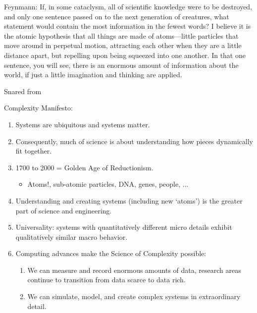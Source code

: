 \begin{frame}
  \small

  \begin{block}{Feynmann:}
    If, in some cataclysm, all of scientific knowledge were to be
    destroyed, and only one sentence passed on to the next generation of
    creatures, what statement would contain the most information in the
    fewest words? I believe it is the atomic hypothesis that all things
    are made of atoms---little particles that move around in perpetual
    motion, attracting each other when they are a little distance apart,
    but repelling upon being squeezed into one another. In that one
    sentence, you will see, there is an enormous amount of information
    about the world, if just a little imagination and thinking are
    applied.
  \end{block}

  \tiny
  Snared from 

\end{frame}


\begin{frame}
  \small

  \begin{block}{Complexity Manifesto:}
    \begin{enumerate}
    \item<+->
      Systems are ubiquitous and systems matter.
    \item<+->
      Consequently, much of science is about understanding
      how pieces dynamically fit together.
    \item<+->
      1700 to 2000 = Golden Age of Reductionism.
      \begin{itemize}
      \item 
        Atoms!, sub-atomic particles, DNA, genes, people, ...
      \end{itemize}
    \item<+->
      Understanding and creating systems (including new `atoms')
      is the greater part of science and engineering.
    \item<+->
      Universality: systems with quantitatively different micro details
      exhibit qualitatively similar macro behavior.
    \item<+->
      Computing advances make the Science of Complexity possible:
      \begin{enumerate}
      \item<+->
        We can measure and record enormous amounts of data,
        research areas continue to transition from data scarce to data rich.
      \item<+->
        We can simulate, model, and create complex systems
        in extraordinary detail.  
      \end{enumerate}
    \end{enumerate}
  \end{block}

\end{frame}




